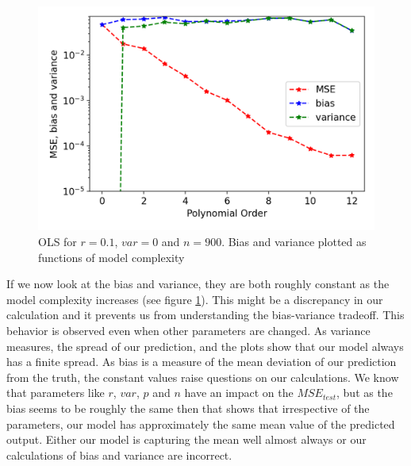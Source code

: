 \begin{figure}[htb]
\centering
\includegraphics[width=.7\linewidth]{Images/ols7.png}
\caption{OLS for $r=0.1$, $var=0$ and $n=900$. Bias and variance plotted as functions of model complexity}
\label{fig:OLS3}
\end{figure}

If we now look at the bias and variance, they are both roughly constant as the model complexity increases (see figure \ref{fig:OLS3}). This might be a discrepancy in our calculation and it prevents us from understanding the bias-variance tradeoff. This behavior is observed even when other parameters are changed. As variance measures, the spread of our prediction, and the plots show that our model always has a finite spread. As bias is a measure of the mean deviation of our prediction from the truth, the constant values raise questions on our calculations. We know that parameters like $r$, $var$, $p$ and $n$ have an impact on the $MSE_{test}$, but as the bias seems to be roughly the same then that shows that irrespective of the parameters, our model has approximately the same mean value of the predicted output. Either our model is capturing the mean well almost always or our calculations of bias and variance are incorrect.


